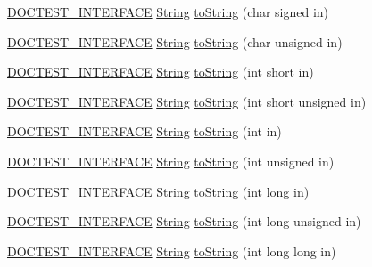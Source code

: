 \begin{DoxyCompactItemize}
\item 
\hyperlink{doctest_8h_a9c16ffc635ec47f07797d21ede26b1a5}{D\+O\+C\+T\+E\+S\+T\+\_\+\+I\+N\+T\+E\+R\+F\+A\+CE} \hyperlink{classdoctest_1_1_string}{String} \hyperlink{namespacedoctest_a1f910fdc13d84a538090b959a97a6fa5}{to\+String} (char signed in)
\item 
\hyperlink{doctest_8h_a9c16ffc635ec47f07797d21ede26b1a5}{D\+O\+C\+T\+E\+S\+T\+\_\+\+I\+N\+T\+E\+R\+F\+A\+CE} \hyperlink{classdoctest_1_1_string}{String} \hyperlink{namespacedoctest_ae2c3e60e3ee32da5d8fc4f778b7a225a}{to\+String} (char unsigned in)
\item 
\hyperlink{doctest_8h_a9c16ffc635ec47f07797d21ede26b1a5}{D\+O\+C\+T\+E\+S\+T\+\_\+\+I\+N\+T\+E\+R\+F\+A\+CE} \hyperlink{classdoctest_1_1_string}{String} \hyperlink{namespacedoctest_aaff61384b81d700818094342c6110d2c}{to\+String} (int short in)
\item 
\hyperlink{doctest_8h_a9c16ffc635ec47f07797d21ede26b1a5}{D\+O\+C\+T\+E\+S\+T\+\_\+\+I\+N\+T\+E\+R\+F\+A\+CE} \hyperlink{classdoctest_1_1_string}{String} \hyperlink{namespacedoctest_a04b10595f3fac969e7682a48fd3ad0c6}{to\+String} (int short unsigned in)
\item 
\hyperlink{doctest_8h_a9c16ffc635ec47f07797d21ede26b1a5}{D\+O\+C\+T\+E\+S\+T\+\_\+\+I\+N\+T\+E\+R\+F\+A\+CE} \hyperlink{classdoctest_1_1_string}{String} \hyperlink{namespacedoctest_a0318ba5a1fbeb9e2fe84227a2f007dac}{to\+String} (int in)
\item 
\hyperlink{doctest_8h_a9c16ffc635ec47f07797d21ede26b1a5}{D\+O\+C\+T\+E\+S\+T\+\_\+\+I\+N\+T\+E\+R\+F\+A\+CE} \hyperlink{classdoctest_1_1_string}{String} \hyperlink{namespacedoctest_a6de63ae787cb530ee050b3632106907d}{to\+String} (int unsigned in)
\item 
\hyperlink{doctest_8h_a9c16ffc635ec47f07797d21ede26b1a5}{D\+O\+C\+T\+E\+S\+T\+\_\+\+I\+N\+T\+E\+R\+F\+A\+CE} \hyperlink{classdoctest_1_1_string}{String} \hyperlink{namespacedoctest_aac941ce13f416e31d72d9fb114681bb2}{to\+String} (int long in)
\item 
\hyperlink{doctest_8h_a9c16ffc635ec47f07797d21ede26b1a5}{D\+O\+C\+T\+E\+S\+T\+\_\+\+I\+N\+T\+E\+R\+F\+A\+CE} \hyperlink{classdoctest_1_1_string}{String} \hyperlink{namespacedoctest_ac1c9dfb0453eb7d222bed9d2a4cf62fd}{to\+String} (int long unsigned in)
\item 
\hyperlink{doctest_8h_a9c16ffc635ec47f07797d21ede26b1a5}{D\+O\+C\+T\+E\+S\+T\+\_\+\+I\+N\+T\+E\+R\+F\+A\+CE} \hyperlink{classdoctest_1_1_string}{String} \hyperlink{namespacedoctest_ada057336406349bd947f26b1ddb97bd0}{to\+String} (int long long in)

\end{DoxyCompactItemize}
